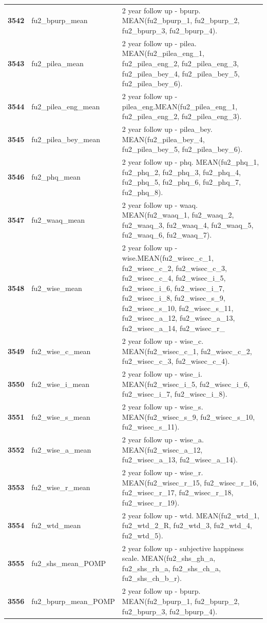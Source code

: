 \documentclass[
  letterpaper,
  DIV=11,
  numbers=noendperiod]{scrartcl}
\begin{document}
\begin{longtable}[t]{>{}cll}
\textbf{3542} & fu2\_bpurp\_mean & 2 year follow up - bpurp. MEAN(fu2\_bpurp\_1, fu2\_bpurp\_2, fu2\_bpurp\_3, fu2\_bpurp\_4).\\
\textbf{3543} & fu2\_pilea\_mean & 2 year follow up - pilea. MEAN(fu2\_pilea\_eng\_1, fu2\_pilea\_eng\_2, fu2\_pilea\_eng\_3, fu2\_pilea\_bey\_4, fu2\_pilea\_bey\_5, fu2\_pilea\_bey\_6).\\
\textbf{3544} & fu2\_pilea\_eng\_mean & 2 year follow up - pilea\_eng.MEAN(fu2\_pilea\_eng\_1, fu2\_pilea\_eng\_2, fu2\_pilea\_eng\_3).\\
\textbf{3545} & fu2\_pilea\_bey\_mean & 2 year follow up - pilea\_bey. MEAN(fu2\_pilea\_bey\_4, fu2\_pilea\_bey\_5, fu2\_pilea\_bey\_6).\\
\addlinespace
\textbf{3546} & fu2\_phq\_mean & 2 year follow up - phq. MEAN(fu2\_phq\_1, fu2\_phq\_2, fu2\_phq\_3, fu2\_phq\_4, fu2\_phq\_5, fu2\_phq\_6, fu2\_phq\_7, fu2\_phq\_8).\\
\textbf{3547} & fu2\_waaq\_mean & 2 year follow up - waaq. MEAN(fu2\_waaq\_1, fu2\_waaq\_2, fu2\_waaq\_3, fu2\_waaq\_4, fu2\_waaq\_5, fu2\_waaq\_6, fu2\_waaq\_7).\\
\textbf{3548} & fu2\_wise\_mean & 2 year follow up - wise.MEAN(fu2\_wisec\_c\_1, fu2\_wisec\_c\_2, fu2\_wisec\_c\_3, fu2\_wisec\_c\_4, fu2\_wisec\_i\_5, fu2\_wisec\_i\_6, fu2\_wisec\_i\_7, fu2\_wisec\_i\_8, fu2\_wisec\_s\_9, fu2\_wisec\_s\_10, fu2\_wisec\_s\_11, fu2\_wisec\_a\_12, fu2\_wisec\_a\_13, fu2\_wisec\_a\_14, fu2\_wisec\_r\_\\
\textbf{3549} & fu2\_wise\_c\_mean & 2 year follow up - wise\_c. MEAN(fu2\_wisec\_c\_1, fu2\_wisec\_c\_2, fu2\_wisec\_c\_3, fu2\_wisec\_c\_4).\\
\textbf{3550} & fu2\_wise\_i\_mean & 2 year follow up - wise\_i. MEAN(fu2\_wisec\_i\_5, fu2\_wisec\_i\_6, fu2\_wisec\_i\_7, fu2\_wisec\_i\_8).\\
\addlinespace
\textbf{3551} & fu2\_wise\_s\_mean & 2 year follow up - wise\_s. MEAN(fu2\_wisec\_s\_9, fu2\_wisec\_s\_10, fu2\_wisec\_s\_11).\\
\textbf{3552} & fu2\_wise\_a\_mean & 2 year follow up - wise\_a. MEAN(fu2\_wisec\_a\_12, fu2\_wisec\_a\_13, fu2\_wisec\_a\_14).\\
\textbf{3553} & fu2\_wise\_r\_mean & 2 year follow up - wise\_r. MEAN(fu2\_wisec\_r\_15, fu2\_wisec\_r\_16, fu2\_wisec\_r\_17, fu2\_wisec\_r\_18, fu2\_wisec\_r\_19).\\
\textbf{3554} & fu2\_wtd\_mean & 2 year follow up - wtd. MEAN(fu2\_wtd\_1, fu2\_wtd\_2\_R, fu2\_wtd\_3, fu2\_wtd\_4, fu2\_wtd\_5).\\
\textbf{3555} & fu2\_shs\_mean\_POMP & 2 year follow up - subjective happiness scale. MEAN(fu2\_shs\_gh\_a, fu2\_shs\_rh\_a, fu2\_shs\_ch\_a, fu2\_shs\_ch\_b\_r).\\
\addlinespace
\textbf{3556} & fu2\_bpurp\_mean\_POMP & 2 year follow up - bpurp. MEAN(fu2\_bpurp\_1, fu2\_bpurp\_2, fu2\_bpurp\_3, fu2\_bpurp\_4).\\
\bottomrule
\end{longtable}
\end{document}
